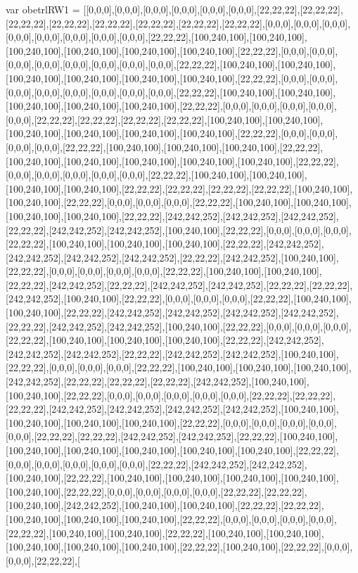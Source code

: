 var obetrlRW1 = [[0,0,0],[0,0,0],[0,0,0],[0,0,0],[0,0,0],[0,0,0],[22,22,22],[22,22,22],[22,22,22],[22,22,22],[22,22,22],[22,22,22],[22,22,22],[22,22,22],[0,0,0],[0,0,0],[0,0,0],[0,0,0],[0,0,0],[0,0,0],[0,0,0],[0,0,0],[22,22,22],[100,240,100],[100,240,100],[100,240,100],[100,240,100],[100,240,100],[100,240,100],[22,22,22],[0,0,0],[0,0,0],[0,0,0],[0,0,0],[0,0,0],[0,0,0],[0,0,0],[0,0,0],[22,22,22],[100,240,100],[100,240,100],[100,240,100],[100,240,100],[100,240,100],[100,240,100],[22,22,22],[0,0,0],[0,0,0],[0,0,0],[0,0,0],[0,0,0],[0,0,0],[0,0,0],[0,0,0],[22,22,22],[100,240,100],[100,240,100],[100,240,100],[100,240,100],[100,240,100],[22,22,22],[0,0,0],[0,0,0],[0,0,0],[0,0,0],[0,0,0],[22,22,22],[22,22,22],[22,22,22],[22,22,22],[100,240,100],[100,240,100],[100,240,100],[100,240,100],[100,240,100],[100,240,100],[22,22,22],[0,0,0],[0,0,0],[0,0,0],[0,0,0],[22,22,22],[100,240,100],[100,240,100],[100,240,100],[22,22,22],[100,240,100],[100,240,100],[100,240,100],[100,240,100],[100,240,100],[22,22,22],[0,0,0],[0,0,0],[0,0,0],[0,0,0],[0,0,0],[22,22,22],[100,240,100],[100,240,100],[100,240,100],[100,240,100],[22,22,22],[22,22,22],[22,22,22],[22,22,22],[100,240,100],[100,240,100],[22,22,22],[0,0,0],[0,0,0],[0,0,0],[22,22,22],[100,240,100],[100,240,100],[100,240,100],[100,240,100],[22,22,22],[242,242,252],[242,242,252],[242,242,252],[22,22,22],[242,242,252],[242,242,252],[100,240,100],[22,22,22],[0,0,0],[0,0,0],[0,0,0],[22,22,22],[100,240,100],[100,240,100],[100,240,100],[22,22,22],[242,242,252],[242,242,252],[242,242,252],[242,242,252],[22,22,22],[242,242,252],[100,240,100],[22,22,22],[0,0,0],[0,0,0],[0,0,0],[0,0,0],[22,22,22],[100,240,100],[100,240,100],[22,22,22],[242,242,252],[22,22,22],[242,242,252],[242,242,252],[22,22,22],[22,22,22],[242,242,252],[100,240,100],[22,22,22],[0,0,0],[0,0,0],[0,0,0],[22,22,22],[100,240,100],[100,240,100],[22,22,22],[242,242,252],[242,242,252],[242,242,252],[242,242,252],[22,22,22],[242,242,252],[242,242,252],[100,240,100],[22,22,22],[0,0,0],[0,0,0],[0,0,0],[22,22,22],[100,240,100],[100,240,100],[100,240,100],[22,22,22],[242,242,252],[242,242,252],[242,242,252],[22,22,22],[242,242,252],[242,242,252],[100,240,100],[22,22,22],[0,0,0],[0,0,0],[0,0,0],[22,22,22],[100,240,100],[100,240,100],[100,240,100],[242,242,252],[22,22,22],[22,22,22],[22,22,22],[242,242,252],[100,240,100],[100,240,100],[22,22,22],[0,0,0],[0,0,0],[0,0,0],[0,0,0],[0,0,0],[22,22,22],[22,22,22],[22,22,22],[242,242,252],[242,242,252],[242,242,252],[242,242,252],[100,240,100],[100,240,100],[100,240,100],[100,240,100],[22,22,22],[0,0,0],[0,0,0],[0,0,0],[0,0,0],[0,0,0],[22,22,22],[22,22,22],[242,242,252],[242,242,252],[22,22,22],[100,240,100],[100,240,100],[100,240,100],[100,240,100],[100,240,100],[100,240,100],[22,22,22],[0,0,0],[0,0,0],[0,0,0],[0,0,0],[0,0,0],[22,22,22],[242,242,252],[242,242,252],[100,240,100],[22,22,22],[100,240,100],[100,240,100],[100,240,100],[100,240,100],[100,240,100],[22,22,22],[0,0,0],[0,0,0],[0,0,0],[0,0,0],[22,22,22],[22,22,22],[100,240,100],[242,242,252],[100,240,100],[100,240,100],[22,22,22],[22,22,22],[100,240,100],[100,240,100],[100,240,100],[22,22,22],[0,0,0],[0,0,0],[0,0,0],[0,0,0],[22,22,22],[100,240,100],[100,240,100],[22,22,22],[100,240,100],[100,240,100],[100,240,100],[100,240,100],[100,240,100],[22,22,22],[100,240,100],[22,22,22],[0,0,0],[0,0,0],[22,22,22],[
